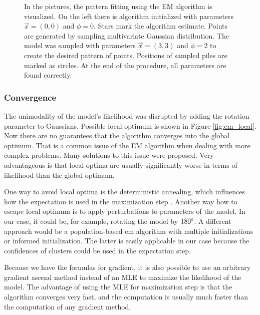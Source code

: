\begin{figure}[H]
\begin{subfigure}{.49\textwidth}
	\end{subfigure}
	
	\caption[EM pattern fitting]{In the pictures, the pattern fitting using the EM algorithm is visualized. On the left there is algorithm initialized with parameters $\vec{x}=(0, 0)$ and $\phi=0$. Stars mark the algorithm estimate. Points are generated by sampling multivariate Gaussian distribution. The model was sampled with parameters $\vec{x}=(3, 3)$ and $\phi=2$ to create the desired pattern of points. Positions of sampled piles are marked as circles. At the end of the procedure, all parameters are found correctly.}
	\label{fig:em_pattern}
\end{figure}

\subsubsection{Convergence}
The unimodality of the model's likelihood was disrupted by adding the rotation parameter to Gaussians. Possible local optimum is shown in Figure \ref{fig:em_local}. Now there are no guarantees that the algorithm converges into the global optimum. That is a common issue of the EM algorithm when dealing with more complex problems. Many solutions to this issue were proposed. Very advantageous is that local optima are usually significantly worse in terms of likelihood than the global optimum. 

One way to avoid local optima is the deterministic annealing, which influences how the expectation is used in the maximization step \cite{ueda1998}. Another way how to escape local optimum is to apply perturbations to parameters of the model. In our case, it could be, for example, rotating the model by $180\degree$. A different approach would be a population-based em algorithm with multiple initializations or informed initialization. The latter is easily applicable in our case because the confidences of clusters could be used in the expectation step. 

Because we have the formulas for gradient, it is also possible to use an arbitrary gradient ascend method instead of an MLE to maximize the likelihood of the model. The advantage of using the MLE for maximization step is that the algorithm converges very fast, and the computation is usually much faster than the computation of any gradient method.

